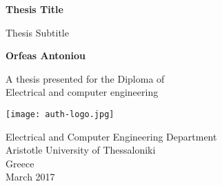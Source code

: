 \begin{titlepage}
    \begin{center}
        \vspace*{1cm}
        
        \Huge
        \textbf{Thesis Title}
        
        \vspace{0.5cm}
        \LARGE
        Thesis Subtitle
        
        \vspace{1.5cm}
        
        \textbf{Orfeas Antoniou}
        
        \vfill
        
        A thesis presented for the Diploma of\\
        Electrical and computer engineering
        
        \vspace{0.8cm}
        
        \texttt{[image: auth-logo.jpg]}
        
        \Large
        Electrical and Computer Engineering Department\\
        Aristotle University of Thessaloniki\\
        Greece\\
        March 2017
        
    \end{center}
\end{titlepage}